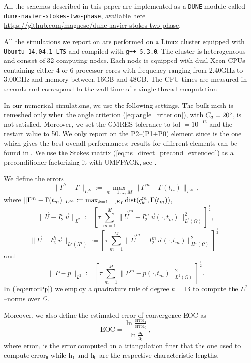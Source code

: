 \documentclass[a4paper,12pt,onecolumn]{article}
\newcommand{\errorXx}{\|\Gamma^h - \Gamma\|_{L^\infty}}
\newcommand{\LerrorUu}[1]{\|\vec U - I^h_{#1}\,\vec u\|_{L^2}}
\newcommand{\HerrorUu}[1]{\|\vec U - I^h_{#1}\,\vec u\|_{L^2(H^1)}}
\newcommand{\LerrorPp}{\|P - p\|_{L^2}}
\newcommand{\myurl}[1]{\hfil\penalty 100 \hfilneg \hbox{\url{#1}}} %
\begin{document}
All the schemes described in this paper are implemented as a \verb|DUNE| module
called \verb|dune-navier-stokes-two-phase|, available here
\myurl{https://github.com/magnese/dune-navier-stokes-two-phase}.

All the simulations we report on are performed on a Linux cluster equipped with
\verb|Ubuntu 14.04.1 LTS| and compiled with \verb|g++ 5.3.0|. The cluster is
heterogeneous and consist of 32 computing nodes. Each node is equipped
with dual Xeon CPUs containing either 4 or 6 processor cores with frequency
ranging from 2.40GHz to 3.00GHz and memory between 16GB and 48GB. The CPU times
are measured in seconds and correspond to the wall time of a single thread
computation.

In our numerical simulations, we use the following settings.
The bulk mesh is remeshed only
when the angle criterion (\ref{eq:angle_criterion}), with $C_a=20\degree$, is
not satisfied. Moreover, we set the GMRES tolerance to tol $=10^{-12}$ and the
restart value to 50. We only report on the P2--(P1+P0) element since is the one
which gives the best overall performances; results for different elements can be
found in \cite{Agnese}. We use the Stokes matrix
(\ref{eq:ns_direct_precond_extended}) as a preconditioner factorizing it with
UMFPACK, see \cite{Davis04}.

We define the errors
\begin{equation} \label{eq:errorXx}
\errorXx := \max_{m=1,\ldots, M} \|\Gamma^m - \Gamma(t_m)\|_{L^\infty}\,,
\end{equation}
where $\|\Gamma^m - \Gamma(t_m)\|_{L^\infty} :=
\max_{k=1,\ldots, K_\Gamma} {\rm dist}( \vec q^m_k, \Gamma(t_m))$,
\begin{equation} \label{eq:errorLUu}
\LerrorUu2 := \left[\tau\,\sum_{m=1}^M \|\vec U^m - I^m_2\,\vec u(\cdot,
t_m)\|_{L^2(\Omega)}^2 \right]^\frac12,
\end{equation}
\begin{equation} \label{eq:errorHUu}
\HerrorUu2 := \left[\tau\,\sum_{m=1}^M \|\vec U^m - I^m_2\,\vec u(\cdot,
t_m)\|_{H^1(\Omega)}^2 \right]^\frac12,
\end{equation}
and
\begin{equation} \label{eq:errorPp}
\LerrorPp := \left[\tau\,\sum_{m=1}^M \|P^m - p(\cdot,t_m)\|_{L^2(\Omega)}^2
\right]^\frac12.
\end{equation}
In (\ref{eq:errorPp}) we employ a quadrature rule of degree $k=13$ to compute
the $L^2$--norms over $\Omega$.

Moreover, we also define the estimated error of convergence EOC as
\begin{equation} \label{eq:eoc}
\mbox{EOC}=\frac{\ln{\frac{\mbox{error}_1}{\mbox{error}_0}}}
{\ln{\frac{\mbox{h}_1}{\mbox{h}_0}}}\,,
\end{equation}
where $\mbox{error}_1$ is the error computed on a triangulation finer that the
one used to compute $\mbox{error}_0$ while $\mbox{h}_1$ and $\mbox{h}_0$ are the
respective characteristic lengths.
\end{document}
